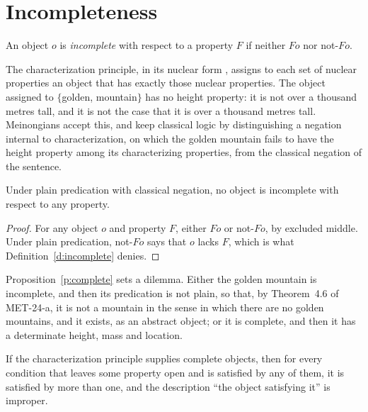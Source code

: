 \documentclass{situationist-preprint}
\begin{document}
\section{Incompleteness}

\begin{definition}[Incompleteness]\label{d:incomplete}
An object $o$ is \emph{incomplete} with respect to a property $F$ if neither $Fo$ nor not-$Fo$.
\end{definition}

The characterization principle, in its nuclear form \citep{Parsons1980}, assigns to each set of nuclear properties an object that has exactly those nuclear properties. The object assigned to $\{$golden, mountain$\}$ has no height property: it is not over a thousand metres tall, and it is not the case that it is over a thousand metres tall. Meinongians accept this, and keep classical logic by distinguishing a negation internal to characterization, on which the golden mountain fails to have the height property among its characterizing properties, from the classical negation of the sentence.

\begin{proposition}\label{p:complete}
Under plain predication with classical negation, no object is incomplete with respect to any property.
\end{proposition}

\begin{proof}
For any object $o$ and property $F$, either $Fo$ or not-$Fo$, by excluded middle. Under plain predication, not-$Fo$ says that $o$ lacks $F$, which is what Definition~\ref{d:incomplete} denies.
\end{proof}

Proposition~\ref{p:complete} sets a dilemma. Either the golden mountain is incomplete, and then its predication is not plain, so that, by Theorem~4.6 of MET-24-a, it is not a mountain in the sense in which there are no golden mountains, and it exists, as an abstract object; or it is complete, and then it has a determinate height, mass and location.

\begin{proposition}\label{p:unique}
If the characterization principle supplies complete objects, then for every condition that leaves some property open and is satisfied by any of them, it is satisfied by more than one, and the description \enquote{the object satisfying it} is improper.
\end{proposition}
\end{document}
